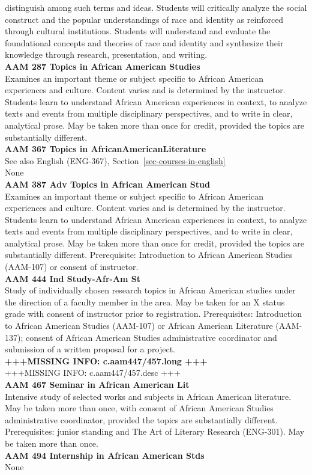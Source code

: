 \documentclass[
  letterpaper,
]{scrbook}
\begin{document}
distinguish among such terms and ideas. Students will critically analyze
the social construct and the popular understandings of race and identity
as reinforced through cultural institutions. Students will understand
and evaluate the foundational concepts and theories of race and identity
and synthesize their knowledge through research, presentation, and
writing.\\
\textbf{AAM 287 Topics in African American Studies}\\
Examines an important theme or subject specific to African American
experiences and culture. Content varies and is determined by the
instructor. Students learn to understand African American experiences in
context, to analyze texts and events from multiple disciplinary
perspectives, and to write in clear, analytical prose. May be taken more
than once for credit, provided the topics are substantially different.\\
\textbf{AAM 367 Topics in AfricanAmericanLiterature}\\
See also English (ENG-367), Section~\ref{sec-courses-in-english}\\
None\\
\textbf{AAM 387 Adv Topics in African American Stud}\\
Examines an important theme or subject specific to African American
experiences and culture. Content varies and is determined by the
instructor. Students learn to understand African American experiences in
context, to analyze texts and events from multiple disciplinary
perspectives, and to write in clear, analytical prose. May be taken more
than once for credit, provided the topics are substantially different.
Prerequisite: Introduction to African American Studies (AAM-107) or
consent of instructor.\\
\textbf{AAM 444 Ind Study-Afr-Am St}\\
Study of individually chosen research topics in African American studies
under the direction of a faculty member in the area. May be taken for an
X status grade with consent of instructor prior to registration.
Prerequisites: Introduction to African American Studies (AAM-107) or
African American Literature (AAM-137); consent of African American
Studies administrative coordinator and submission of a written proposal
for a project.\\
\textbf{+++MISSING INFO: c.aam447/457.long +++}\\
+++MISSING INFO: c.aam447/457.desc +++\\
\textbf{AAM 467 Seminar in African American Lit}\\
Intensive study of selected works and subjects in African American
literature. May be taken more than once, with consent of African
American Studies administrative coordinator, provided the topics are
substantially different. Prerequisites: junior standing and The Art of
Literary Research (ENG-301). May be taken more than once.\\
\textbf{AAM 494 Internship in African American Stds}\\
None
\end{document}
